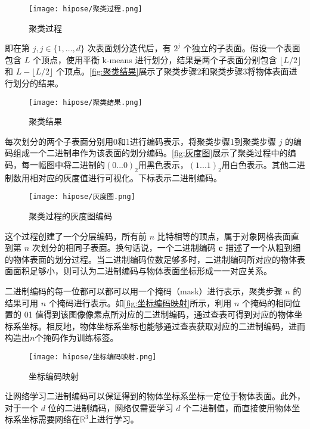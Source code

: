 \begin{figure}[htbp]
    \centering
    \texttt{[image: hipose/聚类过程.png]}
    \caption{聚类过程}
    \label{fig:聚类过程}
\end{figure}

即在第 $j, j \in \{1, \ldots, d\}$ 次表面划分迭代后，有 $2^{j}$ 个独立的子表面。假设一个表面包含 $L$ 个顶点，使用平衡 k-means 进行划分，结果是两个子表面分别包含 $\lfloor L/2 \rfloor$ 和 $L-\lfloor L/2 \rfloor$ 个顶点。\autoref{fig:聚类结果}展示了聚类步骤2和聚类步骤3将物体表面进行划分的结果。

\begin{figure}[htbp]
    \centering
    \texttt{[image: hipose/聚类结果.png]}
    \caption{聚类结果}
    \label{fig:聚类结果}
\end{figure}

每次划分的两个子表面分别用0和1进行编码表示，将聚类步骤1到聚类步骤 $j$ 的编码组成一个二进制串作为该表面的划分编码。\autoref{fig:灰度图}展示了聚类过程中的编码，每一幅图中将二进制的$(0...0)_2$用黑色表示，$(1...1)_2$用白色表示。其他二进制数用相对应的灰度值进行可视化。下标表示二进制编码。

\begin{figure}[ht]
    \centering
    \texttt{[image: hipose/灰度图.png]}
    \caption{聚类过程的灰度图编码}
    \label{fig:灰度图}
\end{figure}

这个过程创建了一个分层编码，所有前 $n$ 比特相等的顶点，属于对象网格表面直到第 $n$ 次划分的相同子表面。换句话说，一个二进制编码 $\mathbf{c}$ 描述了一个从粗到细的物体表面的划分过程。当二进制编码位数足够多时，二进制编码所对应的物体表面面积足够小，则可认为二进制编码与物体表面坐标形成一一对应关系。

二进制编码的每一位都可以都可以用一个掩码（mask）进行表示，聚类步骤 $n$ 的结果可用 $n$ 个掩码进行表示。如\autoref{fig:坐标编码映射}所示，利用 $n$ 个掩码的相同位置的 01 值得到该图像像素点所对应的二进制编码，通过查表可得到对应的物体坐标系坐标。相反地，物体坐标系坐标也能够通过查表获取对应的二进制编码，进而构造出$n$个掩码作为训练标签。

\begin{figure}[ht]
    \centering
    \texttt{[image: hipose/坐标编码映射.png]}
    \caption{坐标编码映射}
    \label{fig:坐标编码映射}
\end{figure}

\par 让网络学习二进制编码可以保证得到的物体坐标系坐标一定位于物体表面。此外，对于一个 $d$ 位的二进制编码，网络仅需要学习 $d$ 个二进制值，而直接使用物体坐标系坐标需要网络在$\mathbb{R}^3$上进行学习。

